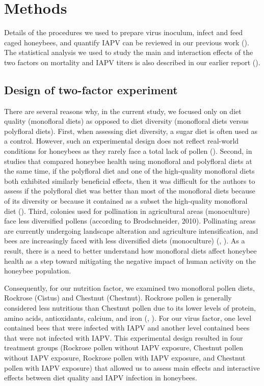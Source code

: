 \documentclass[11pt,a4paper,oldfontcommands,openany]{memoir}
\numberwithin{equation}{section} %
\begin{document}
\section{Methods}

Details of the procedures we used to prepare virus inoculum, infect and feed caged honeybees, and quantify IAPV can be reviewed in our previous work (\citealt{adamInt}). The statistical analysis we used to study the main and interaction effects of the two factors on mortality and IAPV titers is also described in our earlier report (\citealt{adamInt}).

\subsection{Design of two-factor experiment}

There are several reasons why, in the current study, we focused only on diet quality (monofloral diets) as opposed to diet diversity (monofloral diets versus polyfloral diets). First, when assessing diet diversity, a sugar diet is often used as a control. However, such an experimental design does not reflect real-world conditions for honeybees as they rarely face a total lack of pollen (\citealt{DiPasquale}). Second, in studies that compared honeybee health using monofloral and polyfloral diets at the same time, if the polyfloral diet and one of the high-quality monofloral diets both exhibited similarly beneficial effects, then it was difficult for the authors to assess if the polyfloral diet was better than most of the monofloral diets because of its diversity or because it contained as a subset the high-quality monofloral diet (\citealt{DiPasquale}). Third, colonies used for pollination in agricultural areas (monoculture) face less diversified pollens (according to Brodschneider, 2010). Pollinating areas are currently undergoing landscape alteration and agriculture intensification, and bees are increasingly faced with less diversified diets (monoculture) (\citealt{landscape1}, \citealt{brodschneider}). As a result, there is a need to better understand how monofloral diets affect honeybee health as a step toward mitigating the negative impact of human activity on the honeybee population.

Consequently, for our nutrition factor, we examined two monofloral pollen diets, Rockrose (Cistus) and Chestnut (Chestnut). Rockrose pollen is generally considered less nutritious than Chestnut pollen due to its lower levels of protein, amino acids, antioxidants, calcium, and iron (\citealt{DiPasquale}, \citealt{adamInt}). For our virus factor, one level contained bees that were infected with IAPV and another level contained bees that were not infected with IAPV. This experimental design resulted in four treatment groups (Rockrose pollen without IAPV exposure, Chestnut pollen without IAPV exposure, Rockrose pollen with IAPV exposure, and Chestnut pollen with IAPV exposure) that allowed us to assess main effects and interactive effects between diet quality and IAPV infection in honeybees.
\end{document}
